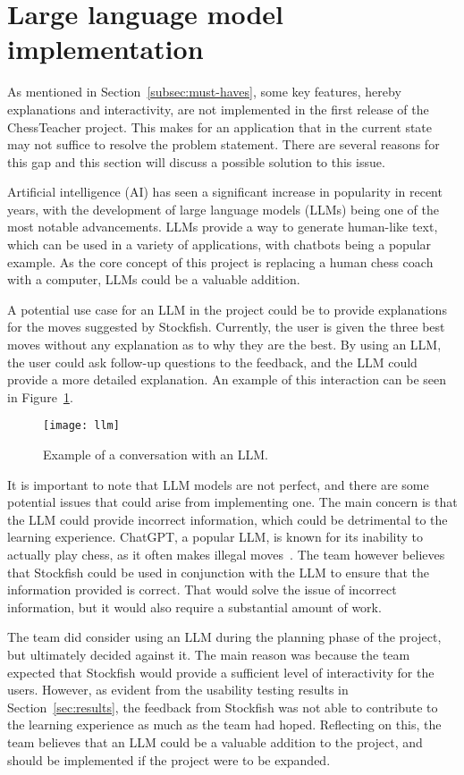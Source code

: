 \section{Large language model implementation}\label{sec:large-language-model-implementation}

As mentioned in Section~\ref{subsec:must-haves}, some key features, hereby explanations and interactivity, are not
implemented in the first release of the ChessTeacher project.
This makes for an application that in the current state may not suffice to resolve the problem statement.
There are several reasons for this gap and this section will discuss a possible solution to this issue.

Artificial intelligence (AI) has seen a significant increase in popularity in recent years, with the development of
large language models (LLMs) being one of the most notable advancements.
LLMs provide a way to generate human-like text, which can be used in a variety of applications, with chatbots being a
popular example.
As the core concept of this project is replacing a human chess coach with a computer, LLMs could be a valuable addition.

A potential use case for an LLM in the project could be to provide explanations for the moves suggested by Stockfish.
Currently, the user is given the three best moves without any explanation as to why they are the best.
By using an LLM, the user could ask follow-up questions to the feedback, and the LLM could provide a more detailed
explanation.
An example of this interaction can be seen in Figure~\ref{fig:llm}.

\begin{figure}[H]
    \centering
    \texttt{[image: llm]}
    \caption{Example of a conversation with an LLM.}\label{fig:llm}
\end{figure}

It is important to note that LLM models are not perfect, and there are some potential issues that could arise from
implementing one.
The main concern is that the LLM could provide incorrect information, which could be detrimental to the learning
experience.
ChatGPT, a popular LLM, is known for its inability to actually play chess, as it often makes illegal
moves~\cite{llm-chess}.
The team however believes that Stockfish could be used in conjunction with the LLM to ensure that the information
provided is correct.
That would solve the issue of incorrect information, but it would also require a substantial amount of work.

The team did consider using an LLM during the planning phase of the project, but ultimately decided against it.
The main reason was because the team expected that Stockfish would provide a sufficient level of interactivity for the
users.
However, as evident from the usability testing results in Section~\ref{sec:results}, the feedback from Stockfish was
not able to contribute to the learning experience as much as the team had hoped.
Reflecting on this, the team believes that an LLM could be a valuable addition to the project, and should be implemented
if the project were to be expanded.

